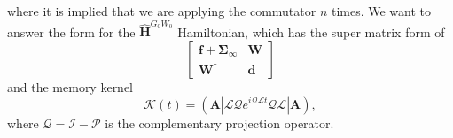 where it is implied that we are applying the commutator $n$ times. We want to answer the form for the $\hat{\textbf{H}}^{G_0W_0}$ Hamiltonian, which has the super matrix form of
\begin{equation}
    \left[\begin{array}{cc}
\mathbf{f}+\boldsymbol{\Sigma}_{\infty} & \mathbf{W} \\
\mathbf{W}^{\dagger} & \mathbf{d}
\end{array}\right]
\end{equation}
and the memory kernel
\begin{equation}
\mathcal{K}(t) = \left(\mathbf{A}\left|\mathcal{L} \mathcal{Q} e^{i \mathcal{Q} \mathcal{L} t} \mathcal{Q} \mathcal{L}\right| \mathbf{A}\right),
\end{equation}
where \( \mathcal{Q} = \mathcal{I} - \mathcal{P} \) is the complementary projection operator.
